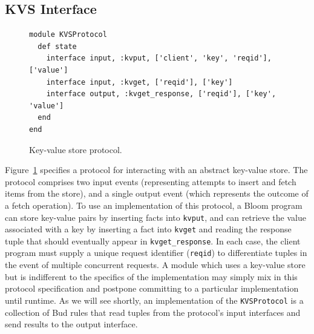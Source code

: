 \subsection{KVS Interface}

\begin{figure}[t]
\begin{scriptsize}
\begin{lstlisting}
module KVSProtocol
  def state
    interface input, :kvput, ['client', 'key', 'reqid'], ['value']
    interface input, :kvget, ['reqid'], ['key']
    interface output, :kvget_response, ['reqid'], ['key', 'value']
  end
end
\end{lstlisting}
\centering
\vspace{-10pt}
\caption{Key-value store protocol.}
\label{fig:kvs-proto}
\end{scriptsize}
\vspace{-2pt}
\end{figure}

Figure~\ref{fig:kvs-proto} specifies a protocol for interacting with an abstract
key-value store. The protocol comprises two input events (representing attempts
to insert and fetch items from the store), and a single output event (which
represents the outcome of a fetch operation). To use an implementation of this
protocol, a Bloom program can store key-value pairs by inserting facts into
\texttt{kvput}, and can retrieve the value associated with a key by inserting a
fact into \texttt{kvget} and reading the response tuple that should eventually
appear in \texttt{kvget\_response}. In each case, the client program must supply
a unique request identifier (\texttt{reqid}) to differentiate tuples in the
event of multiple concurrent requests.  A module which uses a key-value store
but is indifferent to the specifics of the implementation may simply mix in this
protocol specification and postpone committing to a particular implementation
until runtime. As we will see shortly, an implementation of the
\texttt{KVSProtocol} is a collection of Bud rules that read tuples from the
protocol's input interfaces and send results to the output interface.

